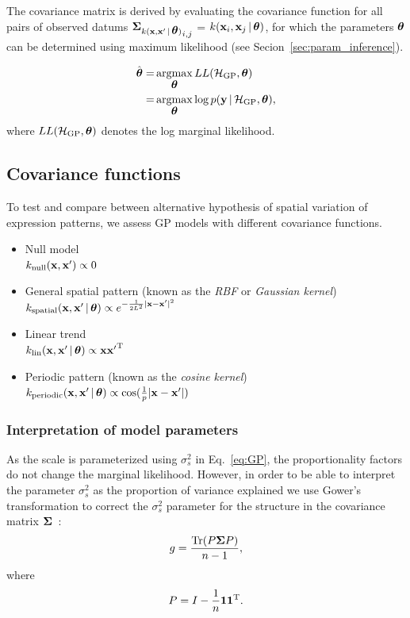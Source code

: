 The covariance matrix is derived by evaluating the covariance function for all pairs of observed datums $ {\mbox{\boldmath $\Sigma$}_{k({\bf x},{\bf x}'\,|\, \mbox{\boldmath $\theta$})}}_{i,j} $ = $ k({\bf x}_i,{\bf x}_j \,|\, \mbox{\boldmath $\theta$})$, for which the parameters $\mbox{\boldmath $\theta$}$ can be determined using maximum likelihood (see Secion~\ref{sec:param_inference}).

\begin{align}
\label{eq:LML}
\hat{\btheta} =& \argmax_{\btheta} LL(\GPM, \btheta) \\
              =& \argmax_{\btheta} \log p(\bfy \given \GPM,\btheta), \nonumber
\end{align}
where $LL(\mathcal{H}_{\text{GP}}, \mbox{\boldmath $\theta$})$ denotes the log marginal likelihood.

\subsection{Covariance functions}
\label{sec:covariance_functions}
To test and compare between alternative hypothesis of spatial variation of expression patterns, we assess GP models with different covariance functions.
\begin{itemize}
\item Null model \\
$k_{\text{null}}({\bf x},{\bf x}')\propto 0$\\
\item General spatial pattern (known as the \textit{RBF} or \textit{Gaussian kernel}) \\
$k_{\text{spatial}}({\bf x},{\bf x}' \,|\, \mbox{\boldmath $\theta$}) \propto e^{ {-\frac{1}{2L^2} | {\bf x}-{\bf x}' |^2}}$\\
\item Linear trend \\
$k_{\text{lin}}({\bf x},{\bf x}' \,|\, \mbox{\boldmath $\theta$}) \propto {\bf x}{{\bf x}'}^{{\rm T}}$\\
\item Periodic pattern (known as the \textit{cosine kernel}) \\
$k_{\text{periodic}}({\bf x},{\bf x}' \,|\, \mbox{\boldmath $\theta$}) \propto \cos({\frac{1}{p} | {\bf x}-{\bf x}' |})$
\end{itemize}

\subsubsection*{Interpretation of model parameters}

As the scale is parameterized using $ \sigma_s^2 $ in Eq.~\ref{eq:GP}, the proportionality factors do not change the marginal likelihood. However, in order to be able to interpret the parameter $ \sigma_s^2 $ as the proportion of variance explained we use Gower's transformation to correct the $ \sigma_s^2 $ parameter for the structure in the covariance matrix $ \mbox{\boldmath $\Sigma$} $~\cite{Kostem2013-gm}:
\[
g = \frac{\mbox{Tr} (P \mbox{\boldmath $\Sigma$} P)}{n - 1},
\]
where
\[
P = I - \frac{1}{n} {\bf 1} {\bf 1}^{{\rm T}}.
\]

